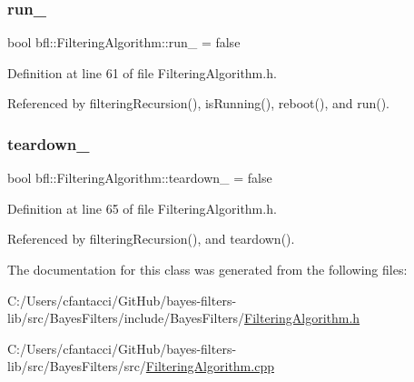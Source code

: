 \subsubsection{\texorpdfstring{run\+\_\+}{run\_}}
{\footnotesize\ttfamily bool bfl\+::\+Filtering\+Algorithm\+::run\+\_\+ = false\hspace{0.3cm}{\ttfamily [private]}}



Definition at line 61 of file Filtering\+Algorithm.\+h.



Referenced by filtering\+Recursion(), is\+Running(), reboot(), and run().

\mbox{\label{classbfl_1_1FilteringAlgorithm_a3bc20cde7fc24767328f8a1ebd3e8cc8}} 
\subsubsection{\texorpdfstring{teardown\+\_\+}{teardown\_}}
{\footnotesize\ttfamily bool bfl\+::\+Filtering\+Algorithm\+::teardown\+\_\+ = false\hspace{0.3cm}{\ttfamily [private]}}



Definition at line 65 of file Filtering\+Algorithm.\+h.



Referenced by filtering\+Recursion(), and teardown().



The documentation for this class was generated from the following files\+:\begin{DoxyCompactItemize}
\item 
C\+:/\+Users/cfantacci/\+Git\+Hub/bayes-\/filters-\/lib/src/\+Bayes\+Filters/include/\+Bayes\+Filters/\mbox{\hyperlink{FilteringAlgorithm_8h}{Filtering\+Algorithm.\+h}}\item 
C\+:/\+Users/cfantacci/\+Git\+Hub/bayes-\/filters-\/lib/src/\+Bayes\+Filters/src/\mbox{\hyperlink{FilteringAlgorithm_8cpp}{Filtering\+Algorithm.\+cpp}}\end{DoxyCompactItemize}
